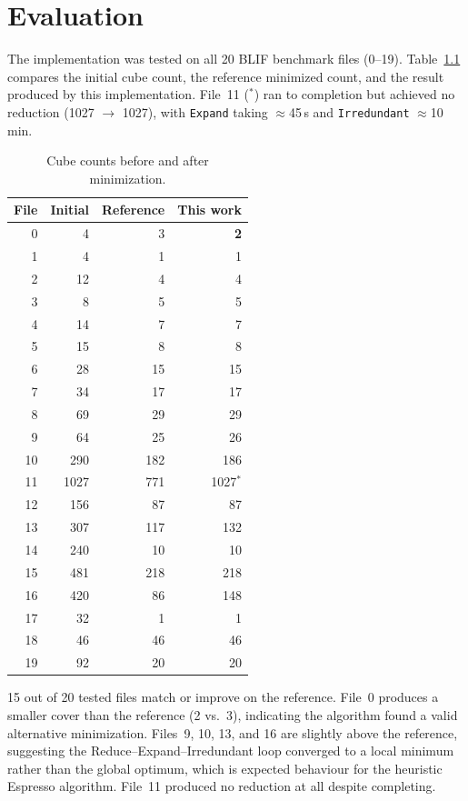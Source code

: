 \chapter{Evaluation}

The implementation was tested on all 20 \ac{BLIF} benchmark files (0--19). Table~\ref{tab:results} compares the initial cube count, the reference minimized count, and the result produced by this implementation. File~11 ($^*$) ran to completion but achieved no reduction (1027 $\to$ 1027), with \texttt{Expand} taking $\approx$45\,s and \texttt{Irredundant} $\approx$10\,min.

\begin{table}[h]
\centering
\begin{tabular}{@{}rrrr@{}}
\toprule
File & Initial & Reference & This work \\
\midrule
0  & 4   & 3   & \textbf{2}   \\
1  & 4   & 1   & 1   \\
2  & 12  & 4   & 4   \\
3  & 8   & 5   & 5   \\
4  & 14  & 7   & 7   \\
5  & 15  & 8   & 8   \\
6  & 28  & 15  & 15  \\
7  & 34  & 17  & 17  \\
8  & 69  & 29  & 29  \\
9  & 64  & 25  & 26  \\
10 & 290 & 182 & 186 \\
11 & 1027 & 771 & 1027$^*$ \\
12 & 156 & 87  & 87  \\
13 & 307 & 117 & 132 \\
14 & 240 & 10  & 10  \\
15 & 481 & 218 & 218 \\
16 & 420 & 86  & 148 \\
17 & 32  & 1   & 1   \\
18 & 46  & 46  & 46  \\
19 & 92  & 20  & 20  \\
\bottomrule
\end{tabular}
\caption{Cube counts before and after minimization.}
\label{tab:results}
\end{table}

15 out of 20 tested files match or improve on the reference. File~0 produces a smaller cover than the reference (2 vs.\ 3), indicating the algorithm found a valid alternative minimization. Files~9, 10, 13, and 16 are slightly above the reference, suggesting the Reduce--Expand--Irredundant loop converged to a local minimum rather than the global optimum, which is expected behaviour for the heuristic Espresso algorithm. File~11 produced no reduction at all despite completing.


